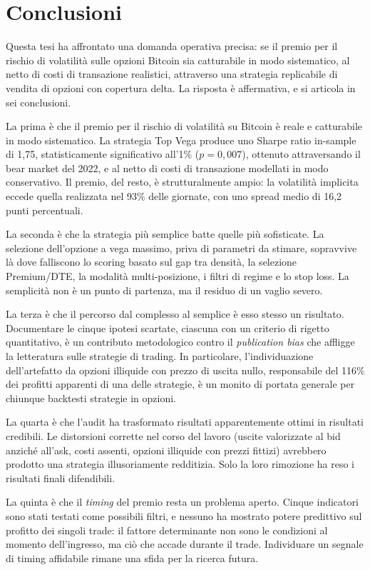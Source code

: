 \chapter{Conclusioni}
\label{ch:conclusioni}

Questa tesi ha affrontato una domanda operativa precisa: se il premio per il
rischio di volatilità sulle opzioni Bitcoin sia catturabile in modo
sistematico, al netto di costi di transazione realistici, attraverso una
strategia replicabile di vendita di opzioni con copertura delta. La risposta
è affermativa, e si articola in sei conclusioni.

La prima è che il premio per il rischio di volatilità su Bitcoin è reale e
catturabile in modo sistematico. La strategia Top Vega produce uno Sharpe
ratio in-sample di 1,75, statisticamente significativo all'1\%
($p = 0{,}007$), ottenuto attraversando il bear market del 2022, e al netto
di costi di transazione modellati in modo conservativo. Il premio, del resto,
è strutturalmente ampio: la volatilità implicita eccede quella realizzata nel
93\% delle giornate, con uno spread medio di 16,2 punti percentuali.

La seconda è che la strategia più semplice batte quelle più sofisticate.
La selezione dell'opzione a vega massimo, priva di parametri da stimare,
sopravvive là dove falliscono lo scoring basato sul gap tra densità, la
selezione Premium/DTE, la modalità multi-posizione, i filtri di regime e lo
stop loss. La semplicità non è un punto di partenza, ma il residuo di un
vaglio severo.

La terza è che il percorso dal complesso al semplice è esso stesso un
risultato. Documentare le cinque ipotesi scartate, ciascuna con un criterio
di rigetto quantitativo, è un contributo metodologico contro il
\emph{publication bias} che affligge la letteratura sulle strategie di
trading. In particolare, l'individuazione dell'artefatto da opzioni
illiquide con prezzo di uscita nullo, responsabile del 116\% dei profitti
apparenti di una delle strategie, è un monito di portata generale per
chiunque backtesti strategie in opzioni.

La quarta è che l'audit ha trasformato risultati apparentemente ottimi in
risultati credibili. Le distorsioni corrette nel corso del lavoro (uscite
valorizzate al bid anziché all'ask, costi assenti, opzioni illiquide con
prezzi fittizi) avrebbero prodotto una strategia illusoriamente redditizia.
Solo la loro rimozione ha reso i risultati finali difendibili.

La quinta è che il \emph{timing} del premio resta un problema aperto. Cinque
indicatori sono stati testati come possibili filtri, e nessuno ha mostrato
potere predittivo sul profitto dei singoli trade: il fattore determinante non
sono le condizioni al momento dell'ingresso, ma ciò che accade durante il
trade. Individuare un segnale di timing affidabile rimane una sfida per la
ricerca futura.

